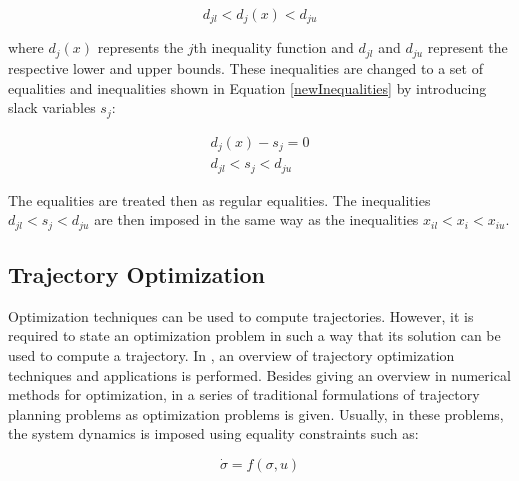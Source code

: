 \begin{equation}
  d_{j l} < d_j(x) < d_{j u}
\end{equation}

where $d_j(x)$ represents the $j$th inequality function and $d_{j l}$ and $d_{j u}$ represent the respective lower and upper bounds. These inequalities are changed to a set of equalities and inequalities shown in Equation \ref{newInequalities} by introducing slack variables $s_j$:

\begin{equation}
    \begin{matrix}
       d_j(x)-s_j=0\\
       d_{j l} < s_j < d_{j u}
    \end{matrix}
    \label{newInequalities}
\end{equation}

The equalities are treated then as regular equalities. The inequalities $d_{j l} < s_j < d_{j u}$ are then imposed in the same way as the inequalities $x_{i l} < x_i < x_{i u}$.

\subsection{Trajectory Optimization}
Optimization techniques can be used to compute trajectories. However,  it is required to state an optimization problem in such a way that its solution can be used to compute a trajectory. In \cite{ref:optimizationReview}, an overview of trajectory optimization techniques and applications is performed. Besides giving an overview in numerical methods for optimization, in \cite{ref:optimizationReview} a series of traditional formulations of trajectory planning problems as optimization problems is given. Usually, in these problems, the system dynamics is imposed using equality constraints such as:

\begin{equation}
    \dot{\sigma} = f(\sigma, u)
\end{equation}

